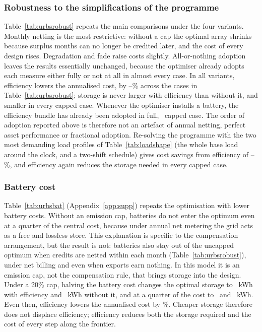 \documentclass[processes,article,submit,pdftex,moreauthors]{Definitions/mdpi}
\begin{document}
\subsubsection{Robustness to the simplifications of the programme}
Table~\ref{tab:urbsrobust} repeats the main comparisons under the four variants. Monthly netting is the most restrictive: without a cap the optimal array shrinks because surplus months can no longer be credited later, and the cost of every design rises. Degradation and fade raise costs slightly. All-or-nothing adoption leaves the results essentially unchanged, because the optimiser already adopts each measure either fully or not at all in almost every case. In all variants, efficiency lowers the annualised cost, by \nURSaveMin--\nURSaveMax\% across the cases in Table~\ref{tab:urbsrobust}; storage is never larger with efficiency than without it, and smaller in every capped case. Whenever the optimiser installs a battery, the efficiency bundle has already been adopted in full, \nURBundleFirst\ capped case. The order of adoption reported above is therefore not an artefact of annual netting, perfect asset performance or fractional adoption. Re-solving the programme with the two most demanding load profiles of Table~\ref{tab:loadshape} (the whole base load around the clock, and a two-shift schedule) gives cost savings from efficiency of \nULSSaveMin--\nULSSaveMax\%, and efficiency again reduces the storage needed in every capped case.



\subsubsection{Battery cost}
Table~\ref{tab:urbsbat} (Appendix~\ref{app:supp}) repeats the optimisation with lower battery costs. Without an emission cap, batteries do not enter the optimum even at a quarter of the central cost, because under annual net metering the grid acts as a free and lossless store. This explanation is specific to the compensation arrangement, but the result is not: batteries also stay out of the uncapped optimum when credits are netted within each month (Table~\ref{tab:urbsrobust}), under net billing and even when exports earn nothing. In this model it is an emission cap, not the compensation rule, that brings storage into the design. Under a 20\% cap, halving the battery cost changes the optimal storage to \nUBatTwentyHalfE~kWh with efficiency and \nUBatTwentyHalfS~kWh without it, and at a quarter of the cost to \nUBatTwentyQuarterE\ and \nUBatTwentyQuarterS~kWh. Even then, efficiency lowers the annualised cost by \nUCostTwentyQuarterSave\%. Cheaper storage therefore does not displace efficiency; efficiency reduces both the storage required and the cost of every step along the frontier.
\end{document}

